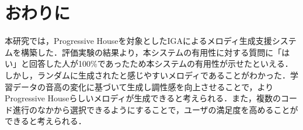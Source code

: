 \chapter{おわりに}
本研究では，Progressive Houseを対象としたIGAによるメロディ生成支援システムを構築した．評価実験の結果より，本システムの有用性に対する質問に「はい」と回答した人が100\%であったため本システムの有用性が示せたといえる．しかし，ランダムに生成されたと感じやすいメロディであることがわかった．学習データの音高の変化に基づいて生成し調性感を向上させることで，よりProgressive Houseらしいメロディが生成できると考えられる．また，複数のコード進行のなかから選択できるようにすることで，ユーザの満足度を高めることができると考えられる．
